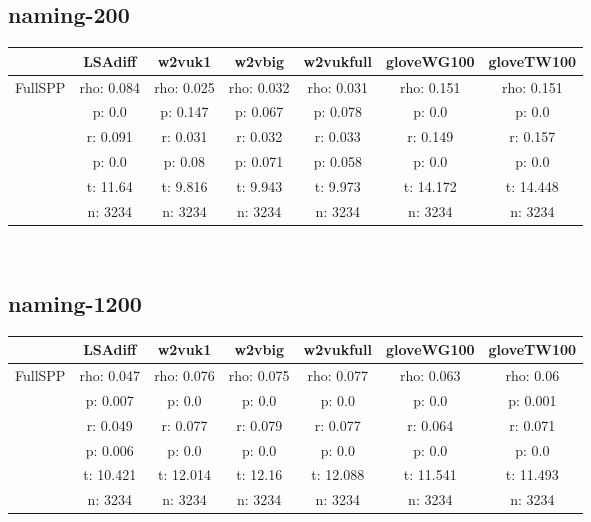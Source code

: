 \documentclass{article}
\begin{document}
\subsection{naming-200}
\begin{tabular}{ccccccc|}\cline{2-7}
&\multicolumn{1}{|c}{LSAdiff} & w2vuk1 & w2vbig & w2vukfull & gloveWG100 & gloveTW100 \\\hline
\multicolumn{1}{|c|}{\multirow{6}{*}{FullSPP}} & rho: 0.084 & rho: 0.025 & rho: 0.032 & rho: 0.031 & rho: 0.151 & rho: 0.151 \\
\multicolumn{1}{|c|}{} & p: 0.0 & p: 0.147 & p: 0.067 & p: 0.078 & p: 0.0 & p: 0.0 \\
\multicolumn{1}{|c|}{} & r: 0.091 & r: 0.031 & r: 0.032 & r: 0.033 & r: 0.149 & r: 0.157 \\
\multicolumn{1}{|c|}{} & p: 0.0 & p: 0.08 & p: 0.071 & p: 0.058 & p: 0.0 & p: 0.0 \\
\multicolumn{1}{|c|}{} & t: 11.64 & t: 9.816 & t: 9.943 & t: 9.973 & t: 14.172 & t: 14.448 \\
\multicolumn{1}{|c|}{} & n: 3234 & n: 3234 & n: 3234 & n: 3234 & n: 3234 & n: 3234 \\
\hline
\end{tabular}\\
\subsection{naming-1200}
\begin{tabular}{ccccccc|}\cline{2-7}
&\multicolumn{1}{|c}{LSAdiff} & w2vuk1 & w2vbig & w2vukfull & gloveWG100 & gloveTW100 \\\hline
\multicolumn{1}{|c|}{\multirow{6}{*}{FullSPP}} & rho: 0.047 & rho: 0.076 & rho: 0.075 & rho: 0.077 & rho: 0.063 & rho: 0.06 \\
\multicolumn{1}{|c|}{} & p: 0.007 & p: 0.0 & p: 0.0 & p: 0.0 & p: 0.0 & p: 0.001 \\
\multicolumn{1}{|c|}{} & r: 0.049 & r: 0.077 & r: 0.079 & r: 0.077 & r: 0.064 & r: 0.071 \\
\multicolumn{1}{|c|}{} & p: 0.006 & p: 0.0 & p: 0.0 & p: 0.0 & p: 0.0 & p: 0.0 \\
\multicolumn{1}{|c|}{} & t: 10.421 & t: 12.014 & t: 12.16 & t: 12.088 & t: 11.541 & t: 11.493 \\
\multicolumn{1}{|c|}{} & n: 3234 & n: 3234 & n: 3234 & n: 3234 & n: 3234 & n: 3234 \\
\hline
\end{tabular}\\
\end{document}
